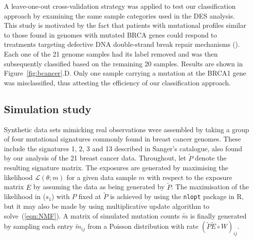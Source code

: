 \documentclass{bioinfo}
\begin{document}
A leave-one-out cross-validation strategy was applied to test our
classification approach by examining the same sample categories used
in the DES analysis. This study is motivated by the fact that patients
with mutational profiles similar to those found in genomes with
mutated BRCA genes could respond to treatments targeting defective DNA
double-strand break repair mechanisms (\citealp{Ash}).  Each one of
the 21 genome samples had its label removed and was then subsequently
classified based on the remaining 20 samples.  Results are shown in
Figure~\ref{fig:bcancer}.D. Only one sample carrying a mutation at the
BRCA1 gene was misclassified, thus attesting the efficiency of our
classification approach.

\subsection{Simulation study}
Synthetic data sets mimicking real observations were assembled by
taking a group of four mutational signatures commonly found in breast
cancer genomes. These include the signatures 1, 2, 3 and 13 described
in Sanger's catalogue, also found by our analysis of the 21 breast
cancer data. Throughout, let $\widetilde P$ denote the resulting
signature matrix.  The exposures are generated by maximising the
likelihood $\mathcal L(\theta; m)$ for a given data sample $m$ with
respect to the exposure matrix $E$ by assuming the data as being
generated by $\widetilde P$. The maximisation of the likelihood in
($s_1$) with $P$ fixed at $\widetilde P$ is achieved by using the
\texttt{nlopt} package in R, but it may also be made by using
\cite{LS} multiplicative update algorithm to solve~(\ref{eqn:NMF}). A
matrix of simulated mutation counts $\widetilde m$ is finally
generated by sampling each entry $\widetilde m_{ij}$ from a Poisson
distribution with rate $(\widetilde P\widetilde E\circ W)_{ij}$.
\end{document}
